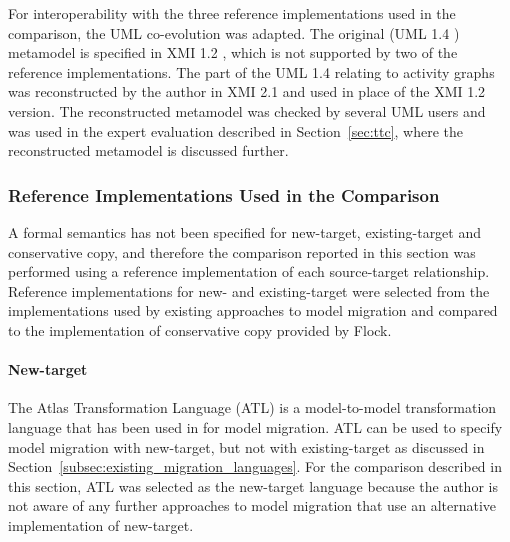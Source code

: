 For interoperability with the three reference implementations used in the comparison, the UML co-evolution was adapted. The original (UML 1.4 \cite{uml14}) metamodel is specified in XMI 1.2 \cite{xmi}, which is not supported by two of the reference implementations. The part of the UML 1.4 relating to activity graphs was reconstructed by the author in XMI 2.1 and used in place of the XMI 1.2 version. The reconstructed metamodel was checked by several UML users and was used in the expert evaluation described in Section~\ref{sec:ttc}, where the reconstructed metamodel is discussed further. 

\subsubsection{Reference Implementations Used in the Comparison}
A formal semantics has not been specified for new-target, existing-target and conservative copy, and therefore the comparison reported in this section was performed using a reference implementation of each source-target relationship. Reference implementations for new- and existing-target were selected from the implementations used by existing approaches to model migration and compared to the implementation of conservative copy provided by Flock.

\paragraph{New-target} The Atlas Transformation Language (ATL) is a model-to-model transformation language that has been used in \cite{cicchetti08automating,garces09managing} for model migration. ATL can be used to specify model migration with new-target, but not with existing-target as discussed in Section~\ref{subsec:existing_migration_languages}. For the comparison described in this section, ATL was selected as the new-target language because the author is not aware of any further approaches to model migration that use an alternative implementation of new-target.

